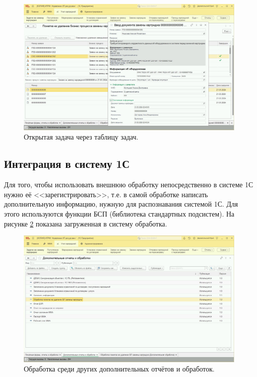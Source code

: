     \begin{figure}[H]
        \centering
        \includegraphics[width=12cm]{pictures/clicked.png}
        \caption{Открытая задача через таблицу задач.}  \label{clicked}
    \end{figure}

    \subsection{Интеграция в систему 1С}
    Для того, чтобы использовать внешнюю обработку непосредственно в системе 1С нужно её <<зарегистрировать>>, т.е. в самой обработке написать дополнительную информацию, нужную для распознавания системой 1С. Для этого используются функции БСП (библиотека стандартных подсистем). На рисунке \ref{external} показана загруженная в систему обработка. 

    \begin{figure}[H]
        \centering
        \includegraphics[width=12cm]{pictures/external.png}
        \caption{Обработка среди других дополнительных отчётов и обработок.}  \label{external}
    \end{figure}